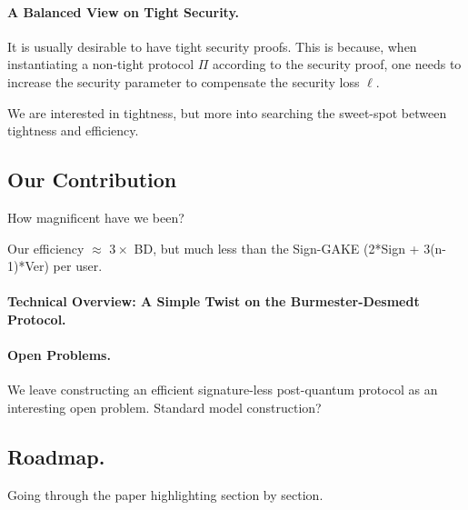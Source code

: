\paragraph{A Balanced View on Tight Security.}
It is usually desirable to have tight security proofs. 
This is because, when instantiating a non-tight protocol $\Pi$ according to the security proof, one needs to increase the security parameter to compensate the security loss $\ell$.

We are interested in tightness, but more into searching the sweet-spot between tightness and efficiency.


\subsection{Our Contribution}
How magnificent have we been?

Our efficiency $\approx$ $3\times $ BD, but much less than the Sign-GAKE (2*Sign + 3(n-1)*Ver) per user.

\paragraph{Technical Overview: A Simple Twist on the Burmester-Desmedt Protocol.}

\paragraph{Open Problems.}
We leave constructing an efficient signature-less post-quantum \introGAKE protocol as an interesting open problem. 
Standard model construction?


\subsection{Roadmap.}
Going through the paper highlighting section by section.
